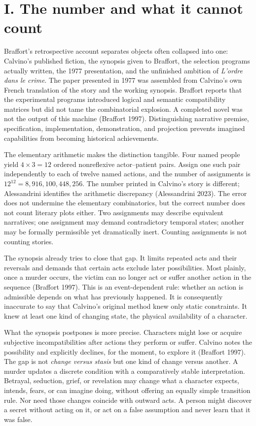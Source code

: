\documentclass[
  11pt,
  letterpaper,
]{article}
\begin{document}
\section{I. The number and what it cannot
count}\label{i.-the-number-and-what-it-cannot-count}

Braffort's retrospective account separates objects often collapsed into
one: Calvino's published fiction, the synopsis given to Braffort, the
selection programs actually written, the 1977 presentation, and the
unfinished ambition of \emph{L'ordre dans le crime}. The paper presented
in 1977 was assembled from Calvino's own French translation of the story
and the working synopsis. Braffort reports that the experimental
programs introduced logical and semantic compatibility matrices but did
not tame the combinatorial explosion. A completed novel was not the
output of this machine (Braffort 1997). Distinguishing narrative
premise, specification, implementation, demonstration, and projection
prevents imagined capabilities from becoming historical achievements.

The elementary arithmetic makes the distinction tangible. Four named
people yield \(4\times3=12\) ordered nonreflexive actor--patient pairs.
Assign one such pair independently to each of twelve named actions, and
the number of assignments is \(12^{12}=8,916,100,448,256\). The number
printed in Calvino's story is different; Alessandrini identifies the
arithmetic discrepancy (Alessandrini 2023). The error does not undermine
the elementary combinatorics, but the correct number does not count
literary plots either. Two assignments may describe equivalent
narratives; one assignment may demand contradictory temporal states;
another may be formally permissible yet dramatically inert. Counting
assignments is not counting stories.

The synopsis already tries to close that gap. It limits repeated acts
and their reversals and demands that certain acts exclude later
possibilities. Most plainly, once a murder occurs, the victim can no
longer act or suffer another action in the sequence (Braffort 1997).
This is an event-dependent rule: whether an action is admissible depends
on what has previously happened. It is consequently inaccurate to say
that Calvino's original method knew only static constraints. It knew at
least one kind of changing state, the physical availability of a
character.

What the synopsis postpones is more precise. Characters might lose or
acquire subjective incompatibilities after actions they perform or
suffer. Calvino notes the possibility and explicitly declines, for the
moment, to explore it (Braffort 1997). The gap is not \emph{change
versus stasis} but one kind of change versus another. A murder updates a
discrete condition with a comparatively stable interpretation. Betrayal,
seduction, grief, or revelation may change what a character expects,
intends, fears, or can imagine doing, without offering an equally simple
transition rule. Nor need those changes coincide with outward acts. A
person might discover a secret without acting on it, or act on a false
assumption and never learn that it was false.
\end{document}
